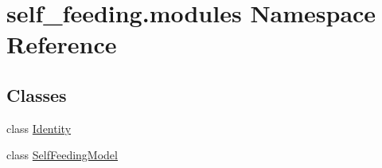 \hypertarget{namespaceself__feeding_1_1modules}{}\section{self\+\_\+feeding.\+modules Namespace Reference}
\label{namespaceself__feeding_1_1modules}
\subsection*{Classes}
\begin{DoxyCompactItemize}
\item 
class \hyperlink{classself__feeding_1_1modules_1_1Identity}{Identity}
\item 
class \hyperlink{classself__feeding_1_1modules_1_1SelfFeedingModel}{Self\+Feeding\+Model}
\end{DoxyCompactItemize}
